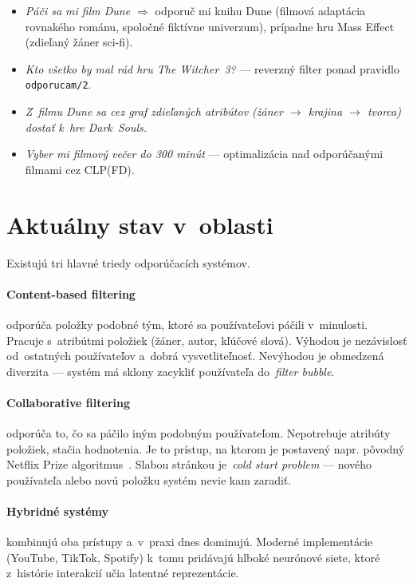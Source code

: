 \documentclass[11pt,a4paper]{article}
\begin{document}
\begin{itemize}[noitemsep]
  \item \emph{Páči sa mi film Dune $\Rightarrow$} odporuč mi
        knihu Dune (filmová adaptácia rovnakého románu, spoločné
        fiktívne univerzum), prípadne hru Mass Effect (zdieľaný
        žáner sci-fi).
  \item \emph{Kto všetko by mal rád hru The Witcher~3?} ---
        reverzný filter ponad pravidlo \texttt{odporucam/2}.
  \item \emph{Z~filmu Dune sa cez graf zdieľaných atribútov
        (žáner $\to$ krajina $\to$ tvorca) dostať k~hre
        Dark~Souls.}
  \item \emph{Vyber mi filmový večer do 300 minút} ---
        optimalizácia nad odporúčanými filmami cez CLP(FD).
\end{itemize}

\section{Aktuálny stav v~oblasti}

Existujú tri hlavné triedy odporúčacích systémov.

\paragraph{Content-based filtering} odporúča položky podobné
tým, ktoré sa používateľovi páčili v~minulosti. Pracuje
s~atribútmi položiek (žáner, autor, kľúčové slová). Výhodou
je nezávislosť od~ostatných používateľov a~dobrá
vysvetliteľnosť. Nevýhodou je obmedzená diverzita --- systém
má sklony zacykliť používateľa do~\emph{filter bubble}.

\paragraph{Collaborative filtering} odporúča to, čo sa páčilo
iným podobným používateľom. Nepotrebuje atribúty položiek, stačia
hodnotenia. Je to prístup, na ktorom je postavený napr. pôvodný
Netflix Prize algoritmus~\cite{aggarwal2016}. Slabou stránkou
je~\emph{cold start problem} --- nového používateľa alebo novú
položku systém nevie kam zaradiť.

\paragraph{Hybridné systémy} kombinujú oba prístupy a~v~praxi
dnes dominujú. Moderné implementácie (YouTube, TikTok, Spotify)
k~tomu pridávajú hlboké neurónové siete, ktoré z~histórie
interakcií učia latentné reprezentácie.
\end{document}
